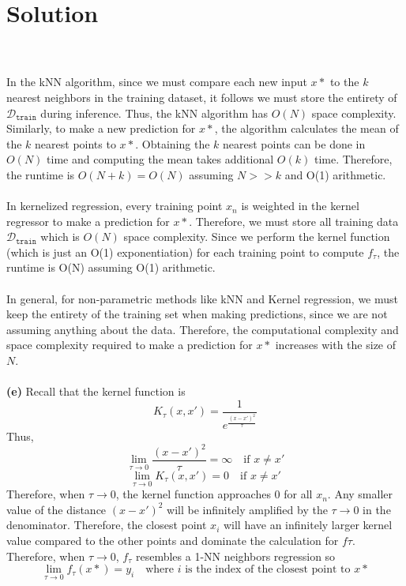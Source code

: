 \documentclass[submit]{../harvardml}
\newenvironment{solution}
  {\color{black}\section*{Solution}}
{}
\begin{document}
\begin{solution}
\begin{tcolorbox}
        \\
        \\
        In the kNN algorithm, since we must compare each new input $x*$ to the $k$ nearest neighbors in the training dataset, it follows we must store the entirety of $\mathcal{D}_\texttt{train}$ during inference. Thus, the kNN algorithm has $O(N)$ space complexity. Similarly, to make a new prediction for $x*$, the algorithm calculates the mean of the $k$ nearest points to $x*$. Obtaining the $k$ nearest points can be done in $O(N)$ time and computing the mean takes additional $O(k)$ time. Therefore, the runtime is $O(N + k) = O(N)$ assuming $N >> k$ and O(1) arithmetic.
        \\
        \\
        In kernelized regression, every training point $x_n$ is weighted in the kernel regressor to make a prediction for $x*$. Therefore, we must store all training data $\mathcal{D}_\texttt{train}$ which is $O(N)$ space complexity. Since we perform the kernel function (which is just an O(1) exponentiation) for each training point to compute $f_\tau$, the runtime is O(N) assuming O(1) arithmetic. 
        \\
        \\
        In general, for non-parametric methods like kNN and Kernel regression, we must keep the entirety of the training set when making predictions, since we are not assuming anything about the data. Therefore, the computational complexity and space complexity required to make a prediction for $x*$ increases with the size of $N$.
        \\
        \\
        \textbf{(e)} Recall that the kernel function is
        $$K_\tau(x,x') = \frac{1}{e^{\frac{(x-x')^2}{\tau}}}$$
        Thus,
        $$\lim_{\tau \rightarrow 0} \frac{(x-x')^2}{\tau} = \infty \quad \text{if $x \neq x'$}$$
        $$\lim_{\tau \rightarrow 0}K_\tau(x,x') = 0 \quad \text{if $x \neq x'$}$$
        Therefore, when $\tau \rightarrow 0$, the kernel function approaches 0 for all $x_n$. Any smaller value of the distance $(x-x')^2$ will be infinitely amplified by the $\tau \rightarrow 0$ in the denominator. Therefore, the closest point $x_i$ will have an infinitely larger kernel value compared to the other points and dominate the calculation for $f\tau$. Therefore, when $\tau \rightarrow 0$, $f_\tau$ resembles a 1-NN neighbors regression so
        $$\lim_{\tau \rightarrow 0} f_\tau(x*) = y_i \quad \text{where $i$ is the index of the closest point to $x*$}$$
        
    \end{tcolorbox}
\end{solution}
\end{document}
